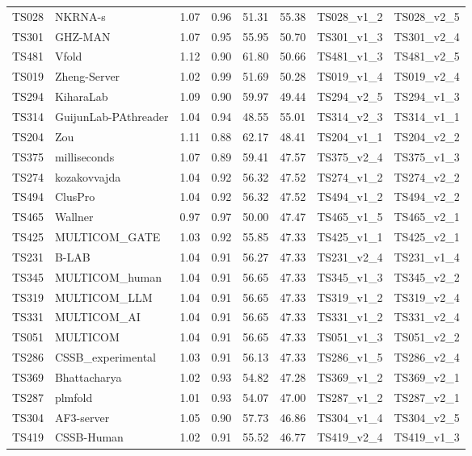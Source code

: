\begin{longtable}{llllllll}
TS028 & NKRNA-s & 1.07 & 0.96 & 51.31 & 55.38 & TS028\_v1\_2 & TS028\_v2\_5 \\ 
TS301 & GHZ-MAN & 1.07 & 0.95 & 55.95 & 50.70 & TS301\_v1\_3 & TS301\_v2\_4 \\ 
TS481 & Vfold & 1.12 & 0.90 & 61.80 & 50.66 & TS481\_v1\_3 & TS481\_v2\_5 \\ 
TS019 & Zheng-Server & 1.02 & 0.99 & 51.69 & 50.28 & TS019\_v1\_4 & TS019\_v2\_4 \\ 
TS294 & KiharaLab & 1.09 & 0.90 & 59.97 & 49.44 & TS294\_v2\_5 & TS294\_v1\_3 \\ 
TS314 & GuijunLab-PAthreader & 1.04 & 0.94 & 48.55 & 55.01 & TS314\_v2\_3 & TS314\_v1\_1 \\ 
TS204 & Zou & 1.11 & 0.88 & 62.17 & 48.41 & TS204\_v1\_1 & TS204\_v2\_2 \\ 
TS375 & milliseconds & 1.07 & 0.89 & 59.41 & 47.57 & TS375\_v2\_4 & TS375\_v1\_3 \\ 
TS274 & kozakovvajda & 1.04 & 0.92 & 56.32 & 47.52 & TS274\_v1\_2 & TS274\_v2\_2 \\ 
TS494 & ClusPro & 1.04 & 0.92 & 56.32 & 47.52 & TS494\_v1\_2 & TS494\_v2\_2 \\ 
TS465 & Wallner & 0.97 & 0.97 & 50.00 & 47.47 & TS465\_v1\_5 & TS465\_v2\_1 \\ 
TS425 & MULTICOM\_GATE & 1.03 & 0.92 & 55.85 & 47.33 & TS425\_v1\_1 & TS425\_v2\_1 \\ 
TS231 & B-LAB & 1.04 & 0.91 & 56.27 & 47.33 & TS231\_v2\_4 & TS231\_v1\_4 \\ 
TS345 & MULTICOM\_human & 1.04 & 0.91 & 56.65 & 47.33 & TS345\_v1\_3 & TS345\_v2\_2 \\ 
TS319 & MULTICOM\_LLM & 1.04 & 0.91 & 56.65 & 47.33 & TS319\_v1\_2 & TS319\_v2\_4 \\ 
TS331 & MULTICOM\_AI & 1.04 & 0.91 & 56.65 & 47.33 & TS331\_v1\_2 & TS331\_v2\_4 \\ 
TS051 & MULTICOM & 1.04 & 0.91 & 56.65 & 47.33 & TS051\_v1\_3 & TS051\_v2\_2 \\ 
TS286 & CSSB\_experimental & 1.03 & 0.91 & 56.13 & 47.33 & TS286\_v1\_5 & TS286\_v2\_4 \\ 
TS369 & Bhattacharya & 1.02 & 0.93 & 54.82 & 47.28 & TS369\_v1\_2 & TS369\_v2\_1 \\ 
TS287 & plmfold & 1.01 & 0.93 & 54.07 & 47.00 & TS287\_v1\_2 & TS287\_v2\_1 \\ 
TS304 & AF3-server & 1.05 & 0.90 & 57.73 & 46.86 & TS304\_v1\_4 & TS304\_v2\_5 \\ 
TS419 & CSSB-Human & 1.02 & 0.91 & 55.52 & 46.77 & TS419\_v2\_4 & TS419\_v1\_3 \\ 

\end{longtable}
